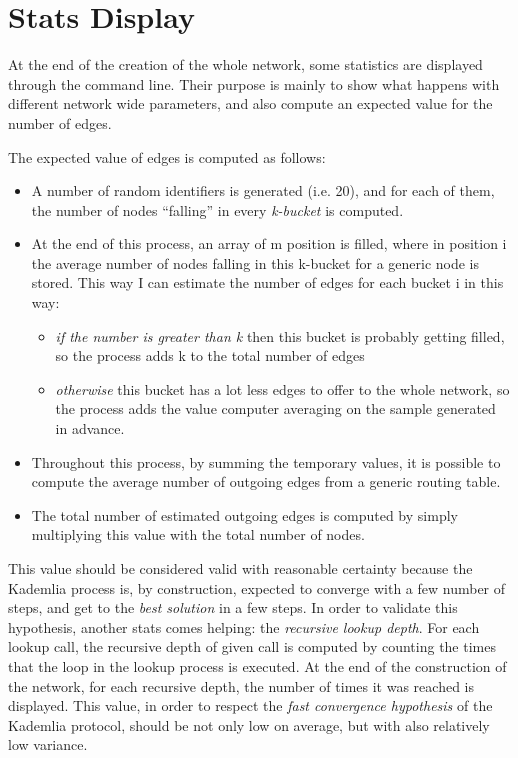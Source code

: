 \documentclass[11pt, a4paper]{report}
\begin{document}
\section*{Stats Display}
	At the end of the creation of the whole network, some statistics are displayed through the command line. Their purpose is mainly to show what happens with different network wide parameters, and also compute an expected value for the number of edges.
	\par
	The expected value of edges is computed as follows:
	\begin{itemize}
		\item A number of random identifiers is generated (i.e. 20), and for each of them, the number of nodes “falling” in every \emph{k-bucket} is computed. 
		\item At the end of this process, an array of m position is filled, where in position i the average number of nodes falling in this k-bucket for a generic node is stored. This way I can estimate the number of edges for each bucket i in this way:
		\begin{itemize}
			\item \emph{if the number is greater than k} then this bucket is probably getting filled, so the process adds k to the total number of edges
			\item \emph{otherwise} this bucket has a lot less edges to offer to the whole network, so the process adds the value computer averaging on the sample generated in advance.
		\end{itemize}
		\item Throughout this process, by summing the temporary values, it is possible to compute the average number of outgoing edges from a generic routing table. 
		\item The total number of estimated outgoing edges is computed by simply multiplying this value with the total number of nodes.
	\end{itemize}
		This value should be considered valid with reasonable certainty because the Kademlia process is, by construction, expected to converge with a few number of steps, and get to the \emph{best solution} in a few steps. In order to validate this hypothesis, another stats comes helping: the \emph{recursive lookup depth}. For each lookup call, the recursive depth of given call is computed by counting the times that the loop in the lookup process is executed. At the end of the construction of the network, for each recursive depth, the number of times it was reached is displayed. This value, in order to respect the \emph{fast convergence hypothesis} of the Kademlia protocol, should be not only low on average, but with also relatively low variance.
\end{document}

